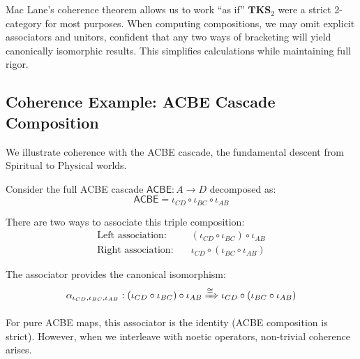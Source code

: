 \begin{remark}
Mac Lane's coherence theorem allows us to work ``as if'' $\mathbf{TKS}_2$ were a strict
2-category for most purposes. When computing compositions, we may omit explicit
associators and unitors, confident that any two ways of bracketing will yield
canonically isomorphic results. This simplifies calculations while maintaining
full rigor.
\end{remark}

\subsection{Coherence Example: ACBE Cascade Composition}

We illustrate coherence with the ACBE cascade, the fundamental descent from
Spiritual to Physical worlds.

\begin{example}
\label{ex:acbe-coherence}
Consider the full ACBE cascade $\mathsf{ACBE} : A \to D$ decomposed as:
\[
  \mathsf{ACBE} = \iota_{CD} \circ \iota_{BC} \circ \iota_{AB}
\]

There are two ways to associate this triple composition:
\begin{align*}
  \text{Left association:} \quad & (\iota_{CD} \circ \iota_{BC}) \circ \iota_{AB} \\
  \text{Right association:} \quad & \iota_{CD} \circ (\iota_{BC} \circ \iota_{AB})
\end{align*}

The associator provides the canonical isomorphism:
\[
  \alpha_{\iota_{CD}, \iota_{BC}, \iota_{AB}} :
  (\iota_{CD} \circ \iota_{BC}) \circ \iota_{AB}
  \xRightarrow{\cong}
  \iota_{CD} \circ (\iota_{BC} \circ \iota_{AB})
\]

For pure ACBE maps, this associator is the identity (ACBE composition is strict).
However, when we interleave with noetic operators, non-trivial coherence arises.
\end{example}

